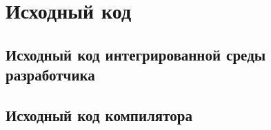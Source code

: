 \chapter{Исходный код}\label{app:A}

\section{Исходный код интегрированной среды разработчика}\label{app:A1}
\begingroup
\captiondelim{ } %

\endgroup

\section{Исходный код компилятора}\label{app:A2}
\begingroup
\captiondelim{ } %

\endgroup
